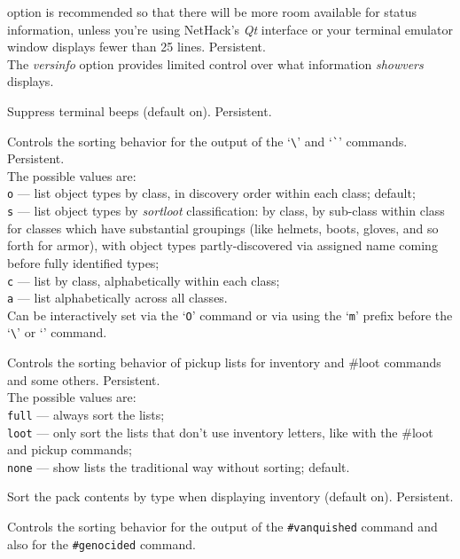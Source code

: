 \documentclass[titlepage]{article}
\begin{document}
\begin{description}[font=\mdseries\itshape]
option is recommended so that there will be more room available for
status information, unless you're using NetHack's \textit{Qt} interface
or your terminal emulator window displays fewer than 25 lines.
Persistent.
\\
The \textit{versinfo}
option provides limited control over what information
\textit{showvers} displays.
\item[silent]
Suppress terminal beeps (default on).  Persistent.
\item[sortdiscoveries]
Controls the sorting behavior for the output of the `\texttt{\textbackslash}'
and `\texttt{\`{}}' commands.
Persistent.
\\
The possible values are:
\\
\texttt{o} --- list object types by class, in discovery order within each class;
default;
\\
\texttt{s} --- list object types by \textit{sortloot}
classification: by class, by sub-class within class for classes which
have substantial groupings (like helmets, boots, gloves, and so forth
for armor), with object types partly-discovered via assigned name coming
before fully identified types;
\\
\texttt{c} --- list by class, alphabetically within each class;\\
\texttt{a} --- list alphabetically across all classes.\\
Can be interactively set via the `\texttt{O}' command or via using
the `\texttt{m}' prefix before the `\texttt{\textbackslash}'
or `\texttt{\textasciigrave}' command.
\item[sortloot]
Controls the sorting behavior of pickup lists for inventory
and \#loot commands and some others.  Persistent.
\\
The possible values are:
\\
\texttt{full} --- always sort the lists;\\
\texttt{loot} --- only sort the lists that don't use inventory
       letters, like with the \#loot and pickup commands;\\
\texttt{none} --- show lists the traditional way without sorting; default.
\item[sortpack]
Sort the pack contents by type when displaying inventory (default on).
Persistent.
\item[sortvanquished]
Controls the sorting behavior for the output of the \texttt{\#vanquished} command
and also for the \texttt{\#genocided} command.

\end{description}
\end{document}
